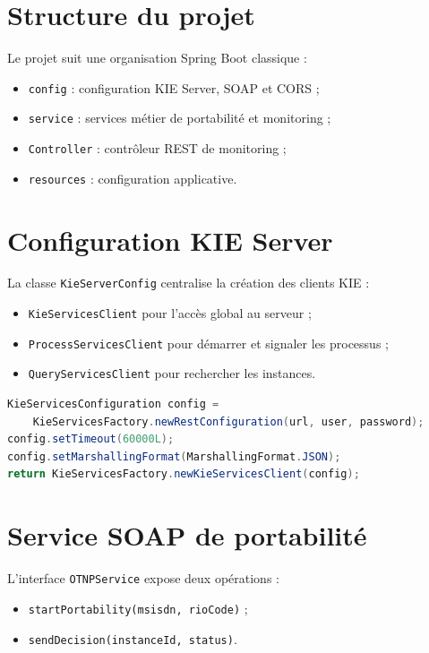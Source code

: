 \documentclass[12pt,a4paper]{report}
\begin{document}
\section{Structure du projet}
Le projet suit une organisation Spring Boot classique :
\begin{itemize}
    \item \texttt{config} : configuration KIE Server, SOAP et CORS ;
    \item \texttt{service} : services métier de portabilité et monitoring ;
    \item \texttt{Controller} : contrôleur REST de monitoring ;
    \item \texttt{resources} : configuration applicative.
\end{itemize}

\section{Configuration KIE Server}
La classe \texttt{KieServerConfig} centralise la création des clients KIE :
\begin{itemize}
    \item \texttt{KieServicesClient} pour l'accès global au serveur ;
    \item \texttt{ProcessServicesClient} pour démarrer et signaler les processus ;
    \item \texttt{QueryServicesClient} pour rechercher les instances.
\end{itemize}

\begin{lstlisting}[language=Java,caption={Création du client KIE Server}]
KieServicesConfiguration config =
    KieServicesFactory.newRestConfiguration(url, user, password);
config.setTimeout(60000L);
config.setMarshallingFormat(MarshallingFormat.JSON);
return KieServicesFactory.newKieServicesClient(config);
\end{lstlisting}

\section{Service SOAP de portabilité}
L'interface \texttt{OTNPService} expose deux opérations :
\begin{itemize}
    \item \texttt{startPortability(msisdn, rioCode)} ;
    \item \texttt{sendDecision(instanceId, status)}.
\end{itemize}
\end{document}
